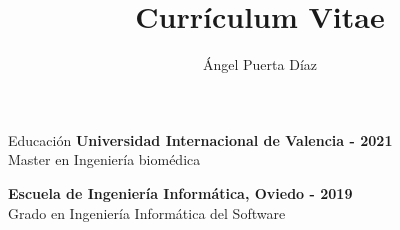 \documentclass{resume}
\title{Currículum Vitae}
\author{Ángel Puerta Díaz}
\begin{document}
\begin{rSection}{Educación}
\normalsize 
{
\bf { \sffamily Universidad Internacional de Valencia}
\hfill  {\footnotesize {} - 2021}
}
\rmfamily
\\Master en Ingeniería biomédica

{
\bf {\sffamily Escuela de Ingeniería Informática, Oviedo}
\hfill  {\footnotesize {} - 2019}
}
\rmfamily
\\Grado en Ingeniería Informática del Software


\end{rSection}


\end{document}
